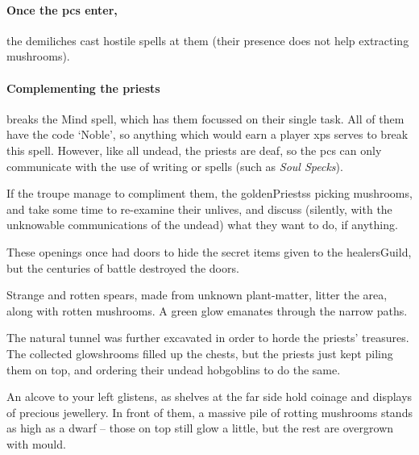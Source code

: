 \begin{multicols}{2}
\paragraph{Once the \glspl{pc} enter,}
the demiliches cast hostile spells at them (their presence does not help extracting mushrooms).

\paragraph{Complementing the priests}
breaks the Mind spell, which has them focussed on their single task.
All of them have the code `Noble', so anything which would earn a player \glspl{xp} serves to break this spell.%
However, like all undead, the priests are deaf, so the \glspl{pc} can only communicate with the use of writing or spells (such as \textit{Soul Specks}).

If the troupe manage to compliment them, the \glspl{goldenPriests} picking mushrooms, and take some time to re-examine their unlives, and discuss (silently, with the unknowable communications of the undead) what they want to do, if anything.


\begin{exampletext}
  These openings once had doors to hide the secret items given to the \gls{healersGuild}, but the centuries of battle destroyed the doors.
\end{exampletext}

Strange and rotten spears, made from unknown plant-matter, litter the area, along with rotten mushrooms.
A green glow emanates through the narrow paths.


\begin{exampletext}
  The natural tunnel was further excavated in order to horde the priests' treasures.
  The collected \glspl{glowshroom} filled up the chests, but the priests just kept piling them on top, and ordering their undead hobgoblins to do the same.
\end{exampletext}

\begin{boxtext}
  An alcove to your left glistens, as shelves at the far side hold coinage and displays of precious jewellery.
  In front of them, a massive pile of rotting mushrooms stands as high as a dwarf -- those on top still glow a little, but the rest are overgrown with mould.


\end{boxtext}
\end{multicols}

